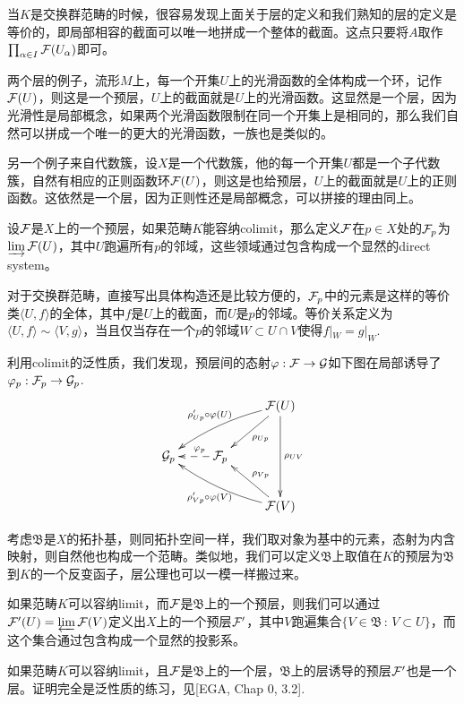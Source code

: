 \para 当$K$是交换群范畴的时候，很容易发现上面关于层的定义和我们熟知的层的定义是等价的，即局部相容的截面可以唯一地拼成一个整体的截面。这点只要将$A$取作$\prod_{\alpha\in I}\mathcal{F}(U_\alpha)$即可。

\para 两个层的例子，流形$M$上，每一个开集$U$上的光滑函数的全体构成一个环，记作$\mathcal{F}(U)$，则这是一个预层，$U$上的截面就是$U$上的光滑函数。这显然是一个层，因为光滑性是局部概念，如果两个光滑函数限制在同一个开集上是相同的，那么我们自然可以拼成一个唯一的更大的光滑函数，一族也是类似的。

另一个例子来自代数簇，设$X$是一个代数簇，他的每一个开集$U$都是一个子代数簇，自然有相应的正则函数环$\mathcal{F}(U)$，则这是也给预层，$U$上的截面就是$U$上的正则函数。这依然是一个层，因为正则性还是局部概念，可以拼接的理由同上。

\para 设$\mathcal{F}$是$X$上的一个预层，如果范畴$K$能容纳colimit，那么定义$\mathcal{F}$在$p\in X$处的$\mathcal{F}_p$为$\varinjlim \mathcal{F}(U)$，其中$U$跑遍所有$p$的邻域，这些领域通过包含构成一个显然的direct system。

对于交换群范畴，直接写出具体构造还是比较方便的，$\mathcal{F}_p$中的元素是这样的等价类$\langle U,f\rangle$的全体，其中$f$是$U$上的截面，而$U$是$p$的邻域。等价关系定义为$\langle U,f\rangle\sim \langle V,g\rangle$，当且仅当存在一个$p$的邻域$W\subset U\cap V$使得$f|_W=g|_W$.

利用colimit的泛性质，我们发现，预层间的态射$\varphi:\mathcal{F}\to\mathcal{G}$如下图在局部诱导了$\varphi_p:\mathcal{F}_p\to\mathcal{G}_p$.
\[
	\xymatrix{
		&&\ar[dl]^{\rho_{Up}}\calf(U)\ar[dd]^{\rho_{UV}}\ar@/_/[lld]_{\rho'_{Up}\circ\varphi(U)} \\
		\calg_p&\ar@{-->}[l]_(0.4){\varphi_p}\calf_p&\\
		&&\ar[ul]_{\rho_{Vp}}\calf(V)\ar@/^/[llu]^{\rho'_{Vp}\circ\varphi(V)}
	}
\]

\para 考虑$\mathfrak{B}$是$X$的拓扑基，则同拓扑空间一样，我们取对象为基中的元素，态射为内含映射，则自然他也构成一个范畴。类似地，我们可以定义$\mathfrak{B}$上取值在$K$的预层为$\mathfrak{B}$到$K$的一个反变函子，层公理也可以一模一样搬过来。

如果范畴$K$可以容纳limit，而$\mathcal{F}$是$\mathfrak{B}$上的一个预层，则我们可以通过$\mathcal{F}'(U)=\varprojlim \mathcal{F}(V)$定义出$X$上的一个预层$\mathcal{F}'$，其中$V$跑遍集合$\{V\in \mathfrak{B}\,:\, V\subset U\}$，而这个集合通过包含构成一个显然的投影系。

\pro 如果范畴$K$可以容纳limit，且$\mathcal{F}$是$\mathfrak{B}$上的一个层，$\mathfrak{B}$上的层诱导的预层$\mathcal{F}'$也是一个层。证明完全是泛性质的练习，见[EGA, Chap 0, 3.2].

